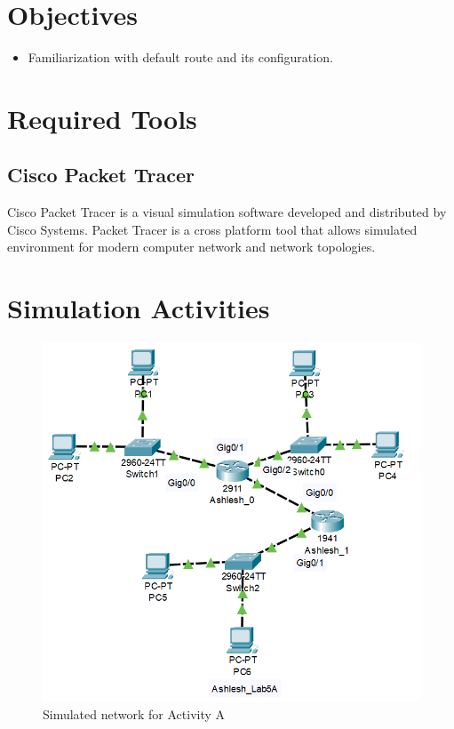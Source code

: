 \documentclass{lab_sheet}
\begin{document}
    \tableofcontents
    \pagebreak
    \listoffigures
    \pagebreak
    \listoftables
    \pagebreak
    \lstlistoflistings
    \pagebreak
    \section{Objectives}
    \begin{itemize}
        \item Familiarization with default route and its configuration.
    \end{itemize}
    \section{Required Tools}
    \subsection{Cisco Packet Tracer}
    Cisco Packet Tracer is a visual simulation software developed and distributed by Cisco Systems. Packet Tracer is a cross platform tool that allows simulated environment for modern computer network and network topologies.
    \section{Simulation Activities}
    \begin{figure}[H]
        \centering
        \includegraphics[scale=.8]{Figures/activitya.png}
        \caption{Simulated network for Activity A}
        \label{fig:activitya}
    \end{figure}
\end{document}

